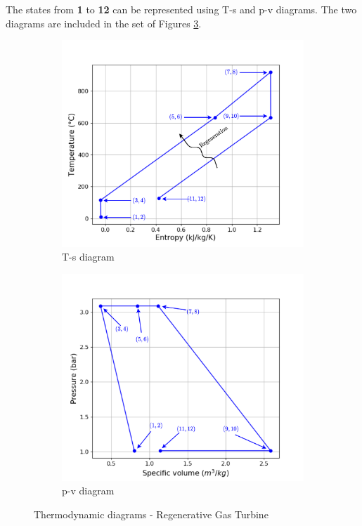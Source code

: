 The states from \textbf{1} to \textbf{12} can be represented using T-s and p-v diagrams. The two diagrams are included in the set of Figures \ref{fig:C5_thermo_diagram_RGT}.

\begin{figure}[h]
     \centering
     \begin{subfigure}[b]{0.4\textwidth}
         \centering
         \includegraphics[width=\textwidth]{Ts_RGT}
         \caption{T-s diagram}
         \label{fig:C5_Ts_RGT}
     \end{subfigure}
     \begin{subfigure}[b]{0.4\textwidth}
         \centering
         \includegraphics[width=\textwidth]{pv_RGT}
         \caption{p-v diagram}
         \label{fig:C5_pv_RGT}
     \end{subfigure}
        \caption{Thermodynamic diagrams - Regenerative Gas Turbine}
        \label{fig:C5_thermo_diagram_RGT}
\end{figure}

